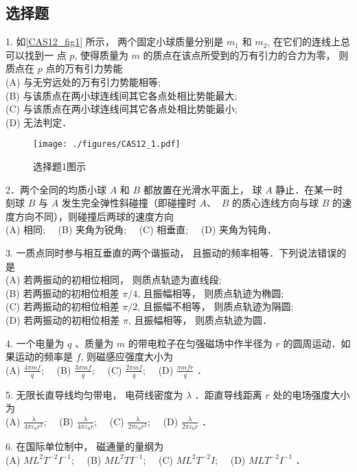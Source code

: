 \subsection{选择题}
1. 如\autoref{CAS12_fig1} 所示， 两个固定小球质量分别是 $m_{1}$ 和 $m_{2}$, 在它们的连线上总可以找到一
点 $p$, 使得质量为 $m$ 的质点在该点所受到的万有引力的合力为零， 则质点在 $p$
点的万有引力势能\\
(A) 与无穷远处的万有引力势能相等;\\
(B) 与该质点在两小球连线间其它各点处相比势能最大;\\
(C) 与该质点在两小球连线间其它各点处相比势能最小;\\
(D) 无法判定．
\begin{figure}[ht]
\centering
\texttt{[image: ./figures/CAS12\_1.pdf]}
\caption{选择题1图示} \label{CAS12_fig1}
\end{figure}
2．两个全同的均质小球 ${A}$ 和 ${B}$ 都放置在光滑水平面上， 球 ${A}$ 静止．在某一时刻球 ${B}$ 与 ${A}$ 发生完全弹性斜碰撞（即碰撞时 ${A}$、 ${~B}$ 的质心连线方向与球 ${B}$ 的速度方向不同），则碰撞后两球的速度方向\\
(A) 相同;$\quad$
(B) 夹角为锐角;$\quad$
(C) 相垂直;$\quad$
(D) 夹角为钝角．

3. 一质点同时参与相互垂直的两个谐振动， 且振动的频率相等．下列说法错误的是\\
(A) 若两振动的初相位相同， 则质点轨迹为直线段;\\
(B) 若两振动的初相位相差 $\pi / 4$, 且振幅相等， 则质点轨迹为椭圆;\\
(C) 若两振动的初相位相差 $\pi / 2$, 且振幅不相等， 则质点轨迹为䧎圆;\\
(D) 若两振动的初相位相差 $\pi$, 且振幅相等， 则质点轨迹为圆．

4. 一个电量为 $q$ 、质量为 $m$ 的带电粒子在匀强磁场中作半径为 $r$ 的圆周运动．如果运动的频率是 $f$, 则磁感应强度大小为\\
(A) $\frac{4 \pi m f}{q}$;$\quad$
(B) $\frac{3 \pi m f}{q}$;$\quad$
(C) $\frac{2 \pi m f}{q}$;$\quad$
(D) $\frac{\pi m f r}{q}$ ．

5. 无限长直导线均匀带电， 电荷线密度为 $\lambda$ ．距直导线距离 $r$ 处的电场强度大小为\\
(A) $\frac{\lambda}{4 \pi \varepsilon_{0} r^{2}}$;$\quad$
(B) $\frac{\lambda}{4 \pi \varepsilon_{0} r}$;$\quad$
(C) $\frac{\lambda}{2 \pi \varepsilon_{0} r^{2}}$;$\quad$
(D) $\frac{\lambda}{2 \pi \varepsilon_{0} r}$ ．

6. 在国际单位制中， 磁通量的量纲为\\
(A) $M L^{2} T^{-2} I^{-1}$;$\quad$
(B) $M L^{2} T I^{-1}$;$\quad$
(C) $M L^{2} T^{-2} I$;$\quad$
(D) $M L T^{-2} I^{-1}$ ．

